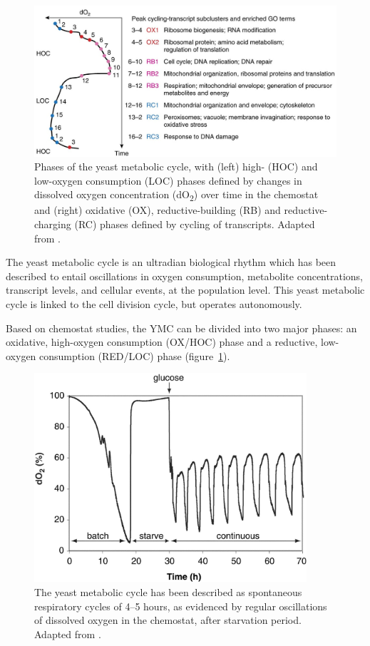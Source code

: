 \begin{figure}
  \centering
  \includegraphics[width=1.0\textwidth]{mellorMolecularBasisMetabolic2016_3c_adapted}
  \caption{
    Phases of the yeast metabolic cycle,
    with (left) high- (HOC) and low-oxygen consumption (LOC) phases defined by changes in dissolved oxygen concentration (dO\textsubscript{2}) over time in the chemostat
    and (right) oxidative (OX), reductive-building (RB) and reductive-charging (RC) phases defined by cycling of transcripts.
    Adapted from \textcite{mellorMolecularBasisMetabolic2016}.}
  \label{fig:intro-ymc-overview}
\end{figure}

The yeast metabolic cycle is an ultradian biological rhythm which has been described to entail oscillations in oxygen consumption, metabolite concentrations, transcript levels, and cellular events, at the population level.
This yeast metabolic cycle is linked to the cell division cycle, but operates autonomously.

Based on chemostat studies,
the YMC can be divided into two major phases: an oxidative, high-oxygen consumption (OX/HOC) phase and a reductive, low-oxygen consumption (RED/LOC) phase (figure~\ref{fig:intro-ymc-overview}).

\begin{figure}
  \centering
  \includegraphics[width=0.9\textwidth]{tuLogicYeastMetabolic2005_1}
  \caption{
    The yeast metabolic cycle has been described as spontaneous respiratory cycles of 4--5 hours, as evidenced by regular oscillations of dissolved oxygen in the chemostat, after starvation period.
    Adapted from \textcite{tuLogicYeastMetabolic2005}.}
  \label{fig:intro-ymc-tu-oxygen}
\end{figure}

